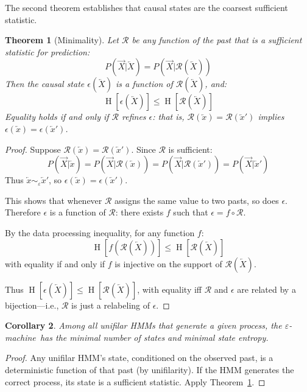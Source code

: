 \documentclass[11pt,twocolumn]{article}
\theoremstyle{plain}
\newtheorem{theorem}{Theorem}[section]
\newtheorem{corollary}[theorem]{Corollary}
\theoremstyle{definition}
\theoremstyle{remark}
\newcommand{\eps}{\varepsilon}
\newcommand{\eM}{$\eps$-machine}
\newcommand{\calR}{\mathcal{R}}
\newcommand{\Past}{\overleftarrow{X}}
\newcommand{\Future}{\overrightarrow{X}}
\newcommand{\past}{\overleftarrow{x}}
\DeclareMathOperator{\Ent}{H}
\begin{document}
The second theorem establishes that causal states are the coarsest sufficient statistic.

\begin{theorem}[Minimality]
\label{thm:minimality}
Let $\calR$ be any function of the past that is a sufficient statistic for prediction:
\begin{equation}
    P(\Future | \Past) = P(\Future | \calR(\Past))
\end{equation}
Then the causal state $\epsilon(\Past)$ is a function of $\calR(\Past)$, and:
\begin{equation}
    \Ent[\epsilon(\Past)] \leq \Ent[\calR(\Past)]
\end{equation}
Equality holds if and only if $\calR$ refines $\epsilon$: that is, $\calR(\past) = \calR(\past')$ implies $\epsilon(\past) = \epsilon(\past')$.
\end{theorem}
\begin{proof}
Suppose $\calR(\past) = \calR(\past')$. Since $\calR$ is sufficient:
\begin{equation}
    P(\Future | \past) = P(\Future | \calR(\past)) = P(\Future | \calR(\past')) = P(\Future | \past')
\end{equation}
Thus $\past \sim_\eps \past'$, so $\epsilon(\past) = \epsilon(\past')$.

This shows that whenever $\calR$ assigns the same value to two pasts, so does $\epsilon$. Therefore $\epsilon$ is a function of $\calR$: there exists $f$ such that $\epsilon = f \circ \calR$.

By the data processing inequality, for any function $f$:
\begin{equation}
    \Ent[f(\calR(\Past))] \leq \Ent[\calR(\Past)]
\end{equation}
with equality if and only if $f$ is injective on the support of $\calR(\Past)$.

Thus $\Ent[\epsilon(\Past)] \leq \Ent[\calR(\Past)]$, with equality iff $\calR$ and $\epsilon$ are related by a bijection---i.e., $\calR$ is just a relabeling of $\epsilon$.
\end{proof}

\begin{corollary}
Among all unifilar HMMs that generate a given process, the \eM\ has the minimal number of states and minimal state entropy.
\end{corollary}
\begin{proof}
Any unifilar HMM's state, conditioned on the observed past, is a deterministic function of that past (by unifilarity). If the HMM generates the correct process, its state is a sufficient statistic. Apply Theorem~\ref{thm:minimality}.
\end{proof}
\end{document}
